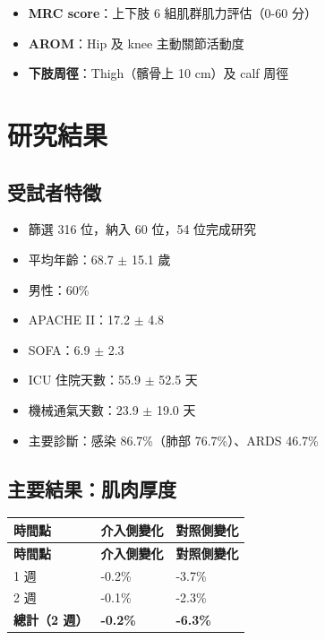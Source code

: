 \documentclass[11pt,a4paper]{article}
\begin{document}
\begin{itemize}
    \item \textbf{MRC score}：上下肢 6 組肌群肌力評估（0-60 分）
    \item \textbf{AROM}：Hip 及 knee 主動關節活動度
    \item \textbf{下肢周徑}：Thigh（髕骨上 10 cm）及 calf 周徑
\end{itemize}

\section{研究結果}

\subsection{受試者特徵}

\begin{itemize}
    \item 篩選 316 位，納入 60 位，54 位完成研究
    \item 平均年齡：68.7 $\pm$ 15.1 歲
    \item 男性：60\%
    \item APACHE II：17.2 $\pm$ 4.8
    \item SOFA：6.9 $\pm$ 2.3
    \item ICU 住院天數：55.9 $\pm$ 52.5 天
    \item 機械通氣天數：23.9 $\pm$ 19.0 天
    \item 主要診斷：感染 86.7\%（肺部 76.7\%）、ARDS 46.7\%
\end{itemize}

\subsection{主要結果：肌肉厚度}

\begin{longtable}{p{4cm}p{5cm}p{5cm}}
\toprule
\textbf{時間點} & \textbf{介入側變化} & \textbf{對照側變化} \\
\midrule
\endfirsthead
\toprule
\textbf{時間點} & \textbf{介入側變化} & \textbf{對照側變化} \\
\midrule
\endhead
1 週 & -0.2\% & -3.7\% \\
\midrule
2 週 & -0.1\% & -2.3\% \\
\midrule
\textbf{總計（2 週）} & \textbf{-0.2\%} & \textbf{-6.3\%} \\
\bottomrule
\end{longtable}
\end{document}
